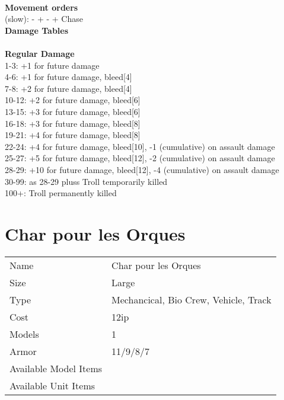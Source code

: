 \ \\ {\bf Movement orders } \\
(slow): - + - + Chase \\



{\bf Damage Tables} \\
\ \\ {\bf Regular Damage } \\
1-3: +1 for future damage \\
4-6: +1 for future damage, bleed[4] \\
7-8: +2 for future damage, bleed[4] \\
10-12: +2 for future damage, bleed[6] \\
13-15: +3 for future damage, bleed[6] \\
16-18: +3 for future damage, bleed[8] \\
19-21: +4 for future damage, bleed[8] \\
22-24: +4 for future damage, bleed[10], -1 (cumulative) on assault damage \\
25-27: +5 for future damage, bleed[12], -2 (cumulative) on assault damage \\
28-29: +10 for future damage, bleed[12], -4 (cumulative) on assault damage \\
30-99: as 28-29 pluss Troll temporarily killed \\
100+: Troll permanently killed \\









\pagebreak

\section{ Char pour les Orques }

\begin{tabular}{ll}
  Name & Char pour les Orques \\
  Size & Large\\
  Type & Mechancical, Bio Crew, Vehicle, Track\\
  Cost & 12ip\\
  Models & 1\\
  Armor & 11/9/8/7\\
  Available Model Items &  \\
  Available Unit Items &  \\
\end{tabular}

